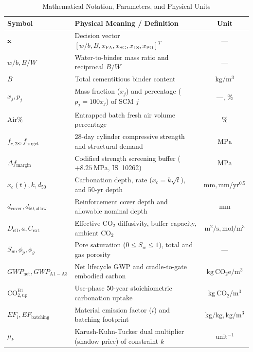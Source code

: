 \documentclass[journal]{IEEEtran}
\begin{document}
\begin{table}[!t]
\caption{Mathematical Notation, Parameters, and Physical Units}
\label{tab:notation}
\centering
\scriptsize
\renewcommand{\arraystretch}{0.55}
\setlength{\tabcolsep}{2.0pt}
\begin{tabularx}{\columnwidth}{l X c}
\toprule
\textbf{Symbol} & \textbf{Physical Meaning / Definition} & \textbf{Unit} \\
\midrule
$\mathbf{x}$ & Decision vector $[w/b, B, x_{\mathrm{FA}}, x_{\mathrm{SG}}, x_{\mathrm{LS}}, x_{\mathrm{PO}}]^T$ & --- \\
$w/b, B/W$ & Water-to-binder mass ratio and reciprocal $B/W$ & --- \\
$B$ & Total cementitious binder content & $\mathrm{kg/m^3}$ \\
$x_j, p_j$ & Mass fraction ($x_j$) and percentage ($p_j = 100 x_j$) of SCM $j$ & ---, \% \\
$\mathrm{Air}\%$ & Entrapped batch fresh air volume percentage & \% \\
$f_{c,28}, f_{\mathrm{target}}$ & 28-day cylinder compressive strength and structural demand & $\mathrm{MPa}$ \\
$\Delta f_{\mathrm{margin}}$ & Codified strength screening buffer ($+8.25\ \mathrm{MPa}$, IS~10262) & $\mathrm{MPa}$ \\
$x_c(t), k, d_{50}$ & Carbonation depth, rate ($x_c = k\sqrt{t}$), and 50-yr depth & $\mathrm{mm}, \mathrm{mm/yr^{0.5}}$ \\
$d_{\mathrm{cover}}, d_{50,\mathrm{allow}}$ & Reinforcement cover depth and allowable nominal depth & $\mathrm{mm}$ \\
$D_{\mathrm{eff}}, a, C_{\mathrm{ext}}$ & Effective $\mathrm{CO}_2$ diffusivity, buffer capacity, ambient $\mathrm{CO}_2$ & $\mathrm{m^2/s}, \mathrm{mol/m^3}$ \\
$S_w, \phi_p, \phi_g$ & Pore saturation ($0 \le S_w \le 1$), total and gas porosity & --- \\
$GWP_{\mathrm{net}}, GWP_{\mathrm{A1-A3}}$ & Net lifecycle GWP and cradle-to-gate embodied carbon & $\mathrm{kg\ CO_2e/m^3}$ \\
$\mathrm{CO}_{2,\mathrm{up}}^{\mathrm{B1}}$ & Use-phase 50-year stoichiometric carbonation uptake & $\mathrm{kg\ CO_2/m^3}$ \\
$EF_i, EF_{\mathrm{batching}}$ & Material emission factor ($i$) and batching footprint & $\mathrm{kg/kg}, \mathrm{kg/m^3}$ \\
$\mu_k$ & Karush-Kuhn-Tucker dual multiplier (shadow price) of constraint $k$ & $\mathrm{unit}^{-1}$ \\
\bottomrule
\end{tabularx}
\end{table}
\end{document}
